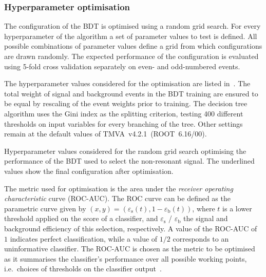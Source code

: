 \subsubsection{Hyperparameter optimisation}

The configuration of the BDT is optimised using a random grid
search. For every hyperparameter of the algorithm a set of parameter
values to test is defined. All possible combinations of parameter
values define a grid from which configurations are drawn randomly. The
expected performance of the configuration is evaluated using 5-fold
cross validation separately on even- and odd-numbered events.

The hyperparameter values considered for the optimisation are listed
in~. The total weight of signal and
background events in the BDT training are ensured to be equal by
rescaling of the event weights prior to training. The decision tree
algorithm uses the Gini index as the splitting criterion, testing 400
different thresholds on input variables for every branching of the
tree. Other settings remain at the default values of
TMVA~v4.2.1~(ROOT~6.16/00).

\begin{table}[htbp]
  \centering
  
  \caption{Hyperparameter values considered for the random grid search optimising the performance of the BDT used to select the non-resonant \HH signal. The underlined values show the final configuration after optimisation.}
  \label{tab:hyperparameter_grid_bdt}
\end{table}

The metric used for optimisation is the area under the \emph{receiver
  operating characteristic} curve (ROC-AUC). The ROC curve can be
defined
as the parametric curve given by
$(x, y) = \left( \varepsilon_{\text{s}}(t), 1 -
  \varepsilon_{\text{b}}(t) \right)$, where $t$ is a lower threshold
applied on the score of a classifier, and $\varepsilon_\text{s}$ /
$\varepsilon_\text{b}$ the signal and background efficiency of this
selection, respectively. A value of the ROC-AUC of $1$ indicates
perfect classification, while a value of $1/2$ corresponds to an
uninformative classifier. The ROC-AUC is chosen as the metric to be
optimised as it summarises the classifier's performance over all
possible working points, i.e.~choices of thresholds on the classifier
output~\cite{james13}.

